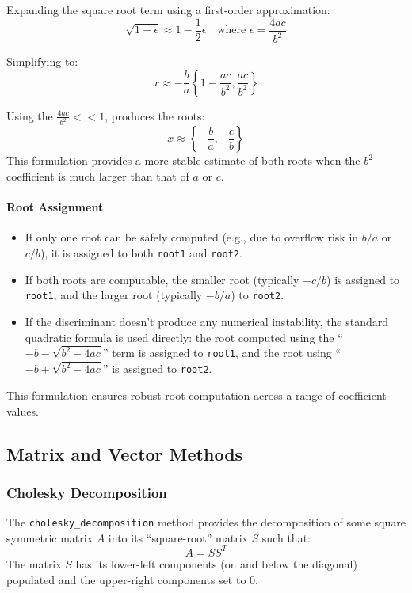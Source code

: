 \documentclass[11pt,fleqn]{report}
\begin{document}
Expanding the square root term using a first-order approximation:
\begin{equation*}
\sqrt{1 - \epsilon} \approx 1 - \frac{1}{2}\epsilon \quad \text{where } \epsilon = \frac{4ac}{b^2}
\end{equation*}

Simplifying to:
\begin{equation*}
x \approx -\frac{b}{a} \left\{1 - \frac{ac}{b^2}, \frac{ac}{b^2}\right\}
\end{equation*}

Using the $\frac{4ac}{b^2} << 1$, produces the roots:
\begin{equation*}
x \approx \left\{-\frac{b}{a}, -\frac{c}{b}\right\}
\end{equation*}
This formulation provides a more stable estimate of both roots when the $b^2$ coefficient is 
much larger than that of $a$ or $c$.

\paragraph{Root Assignment}
\begin{itemize}
  \item If only one root can be safely computed (e.g., due to overflow risk in $b/a$ or $c/b$), it 
  is assigned to both \texttt{root1} and \texttt{root2}.
  \item If both roots are computable, the smaller root (typically $-c/b$) is assigned to \texttt{root1}, 
  and the larger root (typically $-b/a$) to \texttt{root2}.
  \item If the discriminant doesn't produce any numerical instability, the standard quadratic formula is
  used directly: the root computed using the ``$-b - \sqrt{b^2 - 4ac}$'' term is assigned to \texttt{root1}, 
  and the root using ``$-b + \sqrt{b^2 - 4ac}$'' is assigned to \texttt{root2}.
\end{itemize}

This formulation ensures robust root computation across a range of coefficient values.

\subsection{Matrix and Vector Methods}

\subsubsection{Cholesky Decomposition}
The \texttt{cholesky\_decomposition} method provides the decomposition of
some square symmetric matrix
$A$ into its ``square-root'' matrix $S$ such that:
\begin{equation*}
A = S S^T
\end{equation*}
The matrix $S$ has its lower-left components (on and below the diagonal)
populated and the upper-right components set to 0.
\end{document}

